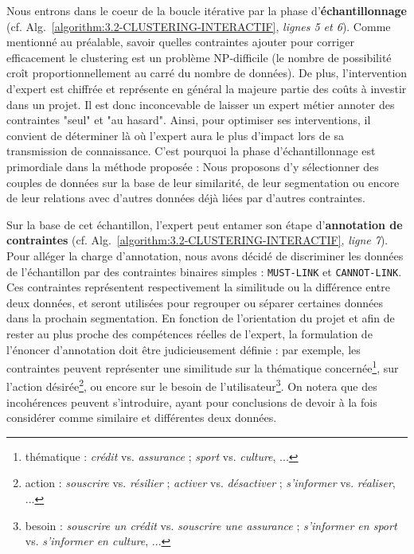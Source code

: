		Nous entrons dans le coeur de la boucle itérative par la phase d'\textbf{échantillonnage} (cf. Alg.~\ref{algorithm:3.2-CLUSTERING-INTERACTIF}, \textit{lignes 5 et 6}).
		Comme mentionné au préalable, savoir quelles contraintes ajouter pour corriger efficacement le clustering est un problème NP-difficile (le nombre de possibilité croît proportionnellement au carré du nombre de données). De plus, l'intervention d'expert est chiffrée et représente en général la majeure partie des coûts à investir dans un projet.
		Il est donc inconcevable de laisser un expert métier annoter des contraintes "seul" et "au hasard".
		Ainsi, pour optimiser ses interventions, il convient de déterminer là où l'expert aura le plus d'impact lors de sa transmission de connaissance. C'est pourquoi la phase d'échantillonnage est primordiale dans la méthode proposée : Nous proposons d'y sélectionner des couples de données sur la base de leur similarité, de leur segmentation ou encore de leur relations avec d'autres données déjà liées par d'autres contraintes.
		
		Sur la base de cet échantillon, l'expert peut entamer son étape d'\textbf{annotation de contraintes} (cf. Alg.~\ref{algorithm:3.2-CLUSTERING-INTERACTIF}, \textit{ligne 7}).
		Pour alléger la charge d'annotation, nous avons décidé de discriminer les données de l'échantillon par des contraintes binaires simples : \texttt{MUST-LINK} et \texttt{CANNOT-LINK}. Ces contraintes représentent respectivement la similitude ou la différence entre deux données, et seront utilisées pour regrouper ou séparer certaines données dans la prochain segmentation.
		En fonction de l'orientation du projet et afin de rester au plus proche des compétences réelles de l'expert, la formulation de l'énoncer d'annotation doit être judicieusement définie : par exemple, les contraintes peuvent représenter une similitude
		sur la thématique concernée\footnote{thématique : \textit{crédit} vs. \textit{assurance} ; \textit{sport} vs. \textit{culture}, ...},
		sur l'action désirée\footnote{action : \textit{souscrire} vs. \textit{résilier} ; \textit{activer} vs. \textit{désactiver} ; \textit{s'informer} vs. \textit{réaliser}, ...},
		ou encore sur le besoin de l'utilisateur\footnote{besoin : \textit{souscrire un crédit} vs. \textit{souscrire une assurance} ; \textit{s'informer en sport} vs. \textit{s'informer en culture}, ...}.
		On notera que des incohérences peuvent s'introduire, ayant pour conclusions de devoir à la fois considérer comme similaire et différentes deux données.
		

